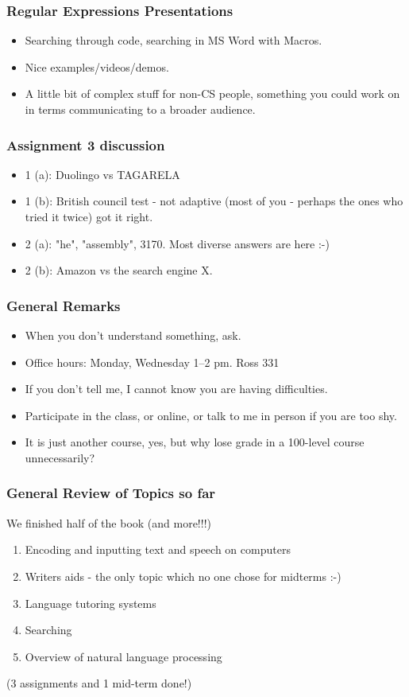 \documentclass{beamer}
\begin{document}
\begin{frame}
\frametitle{Regular Expressions Presentations}
 \begin{itemize}
 \item Searching through code, searching in MS Word with Macros.
\item Nice examples/videos/demos.
\item A little bit of complex stuff for non-CS people, something you could work on in terms communicating to a broader audience.
 \end{itemize}
\end{frame}

\begin{frame}
\frametitle{Assignment 3 discussion}
 \begin{itemize}
 \item 1 (a): Duolingo vs TAGARELA
\item 1 (b):  British council test - not adaptive (most of you - perhaps the ones who tried it twice) got it right. 	
\item 2 (a): "he", "assembly", 3170. Most diverse answers are here :-) 
\item 2 (b): Amazon vs the search engine X. 
 \end{itemize}
\end{frame}

\begin{frame}
\frametitle{General Remarks}
 \begin{itemize}
\item When you don't understand something, ask.
\item Office hours: Monday, Wednesday 1--2 pm. Ross 331 \pause
\item If you don't tell me, I cannot know you are having difficulties.
\item Participate in the class, or online, or talk to me in person if you are too shy. \pause
\item It is just another course, yes, but why lose grade in a 100-level course unnecessarily?
 \end{itemize}
\end{frame}

\begin{frame}
\frametitle{General Review of Topics so far}
We finished half of the book (and more!!!)
\begin{enumerate}
\item Encoding and inputting text and speech on computers
\item Writers aids - the only topic which no one chose for midterms :-)
\item Language tutoring systems
\item Searching
\item Overview of natural language processing
\end{enumerate}
(3 assignments and 1 mid-term done!)
\end{frame}
\end{document}
